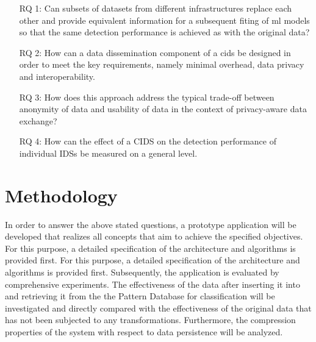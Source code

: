 \documentclass[../../main.tex]{subfiles}
\begin{document}
\begin{itemize}[leftmargin=6em]

    \item[RQ 1:] Can subsets of datasets from different infrastructures replace each other and provide equivalent information for a subsequent fiting of \gls{ml} models so that the same detection performance is achieved as with the original data? 
 
    \item[RQ 2:] How can a data dissemination component of a \gls{cids} be designed in order to meet the key requirements, namely minimal overhead, data privacy and interoperability.

    \item[RQ 3:] How does this approach address the typical trade-off between anonymity of data and usability of data in the context of privacy-aware data exchange?

    \item[RQ 4:] How can the effect of a CIDS on the detection performance of individual IDSs be measured on a general level.

  \end{itemize}

\section{Methodology}
In order to answer the above stated questions, a prototype application will be developed that realizes all concepts that aim to achieve the specified objectives. For this purpose, a detailed specification of the architecture and algorithms is provided first. For this purpose, a detailed specification of the architecture and algorithms is provided first. Subsequently, the application is evaluated by comprehensive experiments. The effectiveness of the data after inserting it into and retrieving it from the the Pattern Database for classification will be investigated and directly compared with the effectiveness of the original data that has not been subjected to any transformations. Furthermore, the compression properties of the system with respect to data persistence will be analyzed.
\end{document}
